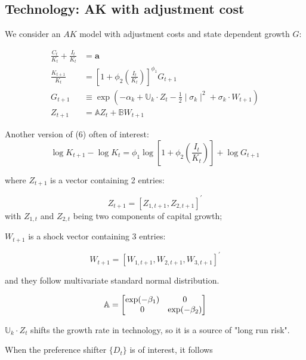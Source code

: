 \documentclass{article}
\theoremstyle{exampstyle}
\begin{document}
\subsection{Technology: AK with adjustment cost}
We consider an $AK$ model with adjustment costs and state dependent growth $G$: 

\begin{align*}
\frac{C_t}{K_t} + \frac{I_t}{K_t} & = {\mathbf a} \tag{5}\\
\frac{K_{t+1}}{K_t}  &= \left[1 + \phi_2 \left({\frac {I_t} {K_t}}\right) \right]^{\phi_1} G_{t+1}\tag{6}\\
G_{t+1} & \equiv \exp \left( - \alpha_k + \mathbb{U}_k \cdot Z_t - {\frac 1 2} \mid \sigma_k \mid^2  + \sigma_k\cdot W_{t+1} \right) \tag{7}\\
 Z_{t+1} &= {\mathbb A} Z_t + \mathbb{B} W_{t+1} \tag{8}
 \end{align*}
 
Another version of (6) often of interest:
\begin{equation*}
\log{K_{t+1}} - \log{K_t} = \phi_1 \log{\left[1 + \phi_2 \left({\frac {I_t} {K_t}}\right) \right]} + \log{G_{t+1}}
\end{equation*}
 
where $Z_{t+1}$ is a vector containing 2 entries:

\begin{equation*}
Z_{t+1} = \left[Z_{1,t+1}, Z_{2,t+1}\right]^{\prime}
\end{equation*}
with $Z_{1,t}$ and $Z_{2,t}$ being two components of capital growth;

$W_{t+1}$ is a shock vector containing 3 entries:

\begin{equation*}
W_{t+1} = \left[W_{1,t+1}, W_{2,t+1}, W_{3,t+1}\right]^{\prime}
\end{equation*}

and they follow multivariate standard normal distribution.

\begin{align}\notag
\mathbb{A} = 
\begin{bmatrix}
\exp(-\beta_1) & 0 \\ 0 & \exp(-\beta_2)
\end{bmatrix}
\end{align}

$\mathbb{U}_k \cdot Z_t$ shifts the growth rate in technology, so it is a source of "long run risk".

When the preference shifter $\{D_t\}$ is of interest, it follows
\end{document}
